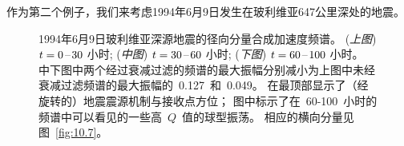作为第二个例子，我们来考虑1994年6月9日发生在玻利维亚647公里深处的地震。
%
\begin{figure}
\begin{center}
\end{center}
\caption[Bolivia spect2]{
\label{fig:10.9}
1994年6月9日玻利维亚深源地震的径向分量合成加速度频谱。
({\em 上图\/}) $t=0\hspace{0.2 mm}$--$\hspace{0.2 mm}30$
小时;
({\em 中图\/}) $t=30\hspace{0.2 mm}$--$\hspace{0.2 mm}60$
小时;
({\em 下图\/}) $t=60\hspace{0.2 mm}$--$\hspace{0.2 mm}100$
小时。
中下图中两个经过衰减过滤的频谱的最大振幅分别减小为上图中未经衰减过滤频谱的最大振幅的~0.127~和~0.049。
在最顶部显示了（经旋转的）地震震源机制与接收点方位；
图中标示了在~60-100~小时的频谱中可以看见的一些高~$Q$~值的球型振荡。
相应的横向分量见图~\protect\ref{fig:10.7}。}
\end{figure}

